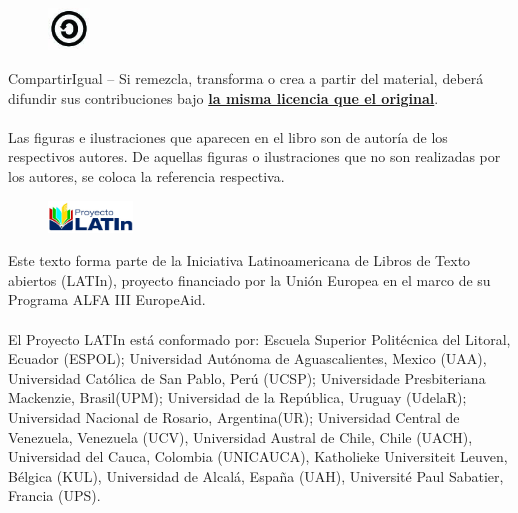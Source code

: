 {\begin{figure}
\vspace{-32pt}
  \begin{center}
    \includegraphics[width=0.1\textwidth]{Pictures/sa.jpg}
  \end{center}
\end{figure}
CompartirIgual -- Si remezcla, transforma o crea a partir del material, deber\'a difundir sus contribuciones bajo \underline{\textbf{la misma licencia que el original}}.
\\
\\Las figuras e ilustraciones que aparecen en el libro son de autor\'ia de los respectivos autores. De aquellas figuras o ilustraciones que no son realizadas por los autores, se coloca la referencia respectiva.

\begin{figure}[h!]
    \includegraphics[width=0.2\textwidth]{Pictures/logolatin.jpg}
\end{figure}

Este texto forma parte de la Iniciativa Latinoamericana de Libros de Texto abiertos (LATIn), proyecto financiado por la Uni\'on Europea en el marco de su Programa ALFA III EuropeAid.\\
\\
El Proyecto LATIn est\'a conformado por: Escuela Superior Polit\'ecnica del Litoral, Ecuador (ESPOL); Universidad Aut\'onoma de Aguascalientes, Mexico (UAA), Universidad Cat\'olica de San Pablo, Per\'u (UCSP); Universidade Presbiteriana Mackenzie, Brasil(UPM); Universidad de la Rep\'ublica, Uruguay (UdelaR); Universidad Nacional de Rosario, Argentina(UR); Universidad Central de Venezuela, Venezuela (UCV), Universidad Austral de Chile, Chile (UACH), Universidad del Cauca, Colombia (UNICAUCA), Katholieke Universiteit Leuven, B\'elgica (KUL), Universidad de Alcal\'a, Espa\~na (UAH), Universit\'e Paul Sabatier, Francia (UPS).

}
